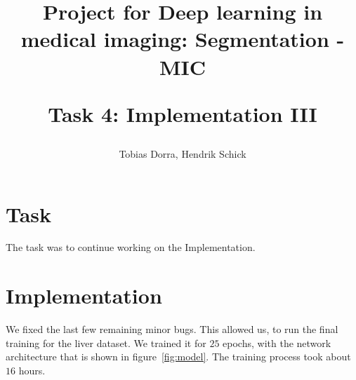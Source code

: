 \documentclass{article}
\author{Tobias Dorra, Hendrik Schick}
\title{Project for Deep learning in medical imaging: Segmentation - MIC \\ \begin{large} 
Task 4: Implementation III
\end{large}}
\begin{document}
	
	\maketitle

	\section{Task}

		The task was to continue working on the Implementation.

	\section{Implementation}

		We fixed the last few remaining minor bugs. This allowed us, to run the final training for the liver dataset. We trained it for $25$ epochs, with the network architecture that is shown in figure~\ref{fig:model}. The training process took about $16$ hours.
\end{document}
